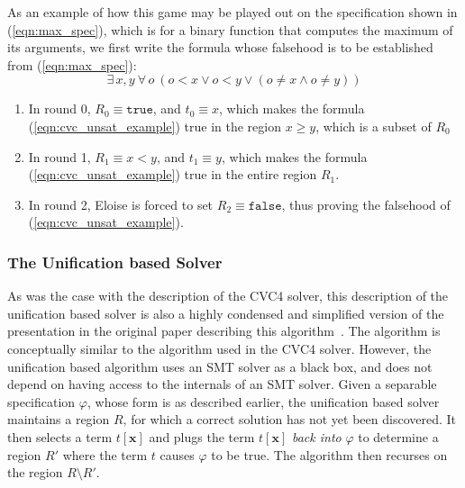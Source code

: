 As an example of how this game may be played out on the specification
shown in (\ref{eqn:max_spec}), which is for a binary function that
computes the maximum of its arguments, we first write the formula
whose falsehood is to be established from (\ref{eqn:max_spec}):
\begin{equation}
\exists\,x, y\ \forall\,o\ (o < x \vee o < y \vee (o \neq x \wedge o
\neq y))
\label{eqn:cvc_unsat_example}
\end{equation}
\begin{enumerate}[start=0]
\item
In round 0, $R_0 \equiv \mathtt{true}$, and $t_0 \equiv x$, which
makes the formula (\ref{eqn:cvc_unsat_example}) true in the region $x \ge
y$, which is a subset of $R_0$
\item
In round 1, $R_1 \equiv x < y$, and $t_1 \equiv y$, which makes the
formula (\ref{eqn:cvc_unsat_example}) true in the entire region $R_1$.
\item
In round 2, Eloise is forced to set $R_2 \equiv \mathtt{false}$, thus
proving the falsehood of (\ref{eqn:cvc_unsat_example}).
\end{enumerate}


\subsubsection{The Unification based 
  Solver}
As was the case with the description of the CVC4 solver, this
description of the unification based solver is also a highly condensed
and simplified version of the presentation in the original paper
describing this algorithm~\cite{radhakrishna-15}. The algorithm is
conceptually similar to the algorithm used in the CVC4 \sygusbody
solver. However, the unification based algorithm uses an SMT solver as
a black box, and does not depend on having access to the internals of
an SMT solver. Given a separable \sygusbody specification $\varphi$, whose
form is as described earlier, the unification based solver maintains a
region $R$, for which a correct solution has not yet been
discovered. It then selects a term $t[\mathbf{x}]$ and plugs the term
$t[\mathbf{x}]$ \emph{back into} $\varphi$ to determine a region $R'$
where the term $t$ causes $\varphi$ to be true. The algorithm then
recurses on the region $R \setminus R'$.

